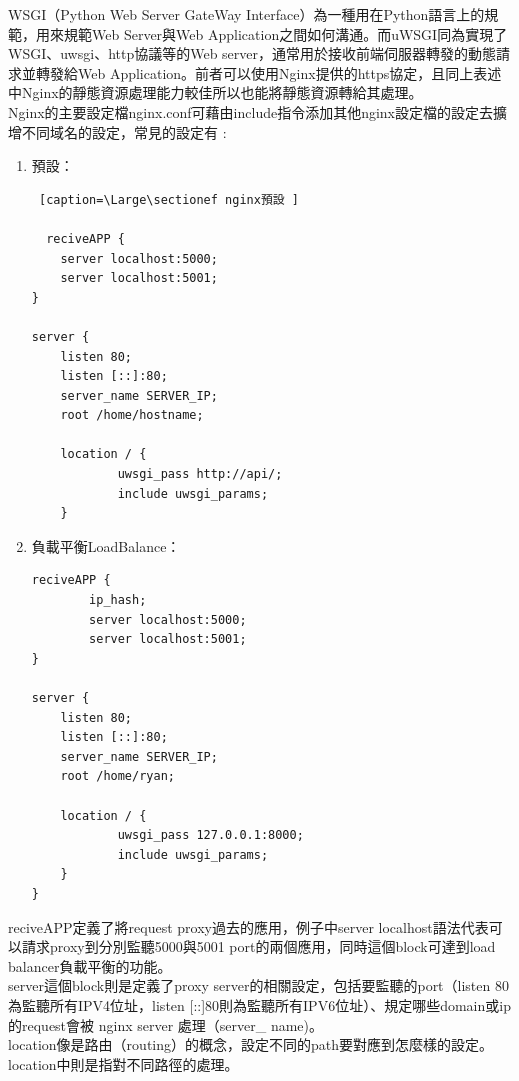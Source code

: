 \documentclass[14pt,a4paper]{report}  %
\begin{document}
 WSGI（Python Web Server GateWay Interface）為一種用在Python語言上的規範，用來規範Web Server與Web Application之間如何溝通。而uWSGI同為實現了WSGI、uwsgi、http協議等的Web server，通常用於接收前端伺服器轉發的動態請求並轉發給Web Application。前者可以使用Nginx提供的https協定，且同上表述中Nginx的靜態資源處理能力較佳所以也能將靜態資源轉給其處理。\\
 
Nginx的主要設定檔nginx.conf可藉由include指令添加其他nginx設定檔的設定去擴增不同域名的設定，常見的設定有 :
\begin{enumerate}
\item 預設：
\begin{lstlisting} [caption=\Large\sectionef nginx預設 ]

  reciveAPP {
    server localhost:5000;
    server localhost:5001;
}

server {
    listen 80;
    listen [::]:80;
    server_name SERVER_IP;
    root /home/hostname;

    location / {
            uwsgi_pass http://api/;
            include uwsgi_params;
    }
\end{lstlisting}
\newpage
\item 負載平衡LoadBalance：
\begin{lstlisting}[caption=\Large\sectionef load ]
  reciveAPP {
        ip_hash;
        server localhost:5000;
        server localhost:5001;
}

server {
    listen 80;
    listen [::]:80;
    server_name SERVER_IP;
    root /home/ryan;

    location / {
            uwsgi_pass 127.0.0.1:8000;
            include uwsgi_params;
    }
}
\end{lstlisting}
\end{enumerate}

 reciveAPP定義了將request proxy過去的應用，例子中server localhost語法代表可以請求proxy到分別監聽5000與5001 port的兩個應用，同時這個block可達到load balancer負載平衡的功能。\\
 
 server這個block則是定義了proxy server的相關設定，包括要監聽的port（listen 80為監聽所有IPV4位址，listen [::]80則為監聽所有IPV6位址）、規定哪些domain或ip的request會被 nginx server 處理（server\_ name)。\\
 
 location像是路由（routing）的概念，設定不同的path要對應到怎麼樣的設定。location中則是指對不同路徑的處理。\\
 
\end{document}
